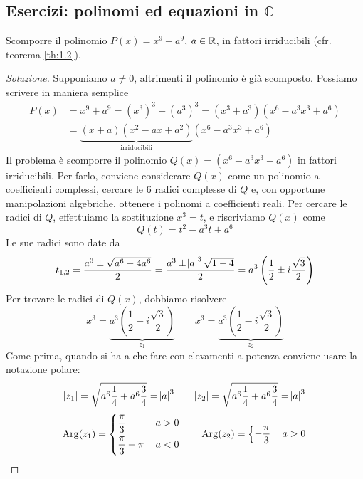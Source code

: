 \subsection{Esercizi: polinomi ed equazioni in \texorpdfstring{$\mathbb{C}$}{C}}
\begin{exercise}
    \label{ex:3.3}
    Scomporre il polinomio $P(x) = x^9+a^9$, $a\in\amsbb{R}$, in fattori irriducibili (cfr. teorema \ref{th:1.2}).
\end{exercise}
\begin{proof}[Soluzione]
    Supponiamo $a\ne 0$, altrimenti il polinomio è già scomposto. Possiamo scrivere in maniera semplice
    \[
    \begin{split}
         P(x) & = x^9 + a^9 = (x^3)^3 + (a^3)^3 = (x^3+a^3)(x^6-a^3x^3+a^6) \\
         & = \underbrace{(x+a)(x^2-ax+a^2)}_{\text{irriducibili}}(x^6-a^3x^3+a^6)
    \end{split}
    \]
    Il problema è scomporre il polinomio $Q(x) = (x^6-a^3x^3+a^6)$ in fattori irriducibili. Per farlo, conviene considerare $Q(x)$ come un polinomio a coefficienti complessi, cercare le 6 radici complesse di $Q$ e, con opportune manipolazioni algebriche, ottenere i polinomi a coefficienti reali. Per cercare le radici di $Q$, effettuiamo la sostituzione $x^3 = t$, e riscriviamo $Q(x)$ come 
    \[
    Q(t) = t^2 -a^3t +a^6
    \]
    Le sue radici sono date da
    \[
    t_{1,2} = \frac{a^3\pm \sqrt{a^6-4a^6}}{2} = \frac{a^3\pm \abs{a}^3\sqrt{1-4}}{2} = a^3\left(\frac{1}{2}\pm i\frac{\sqrt{3}}{2}\right)
    \]
    Per trovare le radici di $Q(x)$, dobbiamo risolvere
    \begin{equation}
        \label{eq:3.7}
        x^3 = \underbrace{a^3\left(\frac{1}{2}+i\frac{\sqrt{3}}{2}\right)}_{z_1} \qquad 
        x^3 = \underbrace{a^3\left(\frac{1}{2}-i\frac{\sqrt{3}}{2}\right)}_{z_2}
    \end{equation}
    Come prima, quando si ha a che fare con elevamenti a potenza conviene usare la notazione polare:
    \[
    \abs{z_1} = \sqrt{a^6\frac{1}{4} + a^6 \frac{3}{4}} = \abs{a}^3 \qquad \abs{z_2} = \sqrt{a^6\frac{1}{4} + a^6 \frac{3}{4}} = \abs{a}^3 
    \]
    \[
    \mathrm{Arg}(z_1) =\begin{dcases}
        \frac{\pi}{3}\, & a>0 \\
         \frac{\pi}{3}+\pi\, & a<0
    \end{dcases}\qquad 
    \mathrm{Arg}(z_2) = \begin{dcases}
         -\frac{\pi}{3}\, & a>0\\

\end{dcases}\]
\end{proof}
